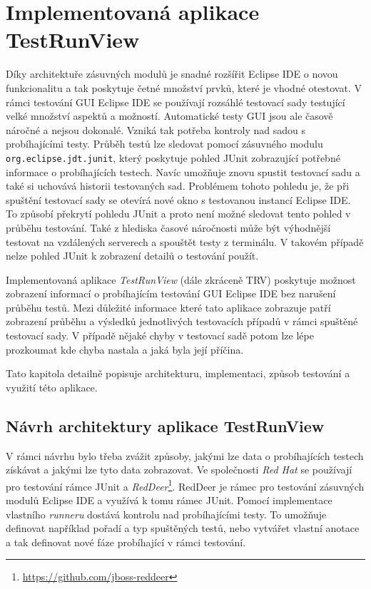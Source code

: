 \chapter{Implementovaná aplikace TestRunView}                             %
Díky architektuře zásuvných modulů je snadné rozšířit Eclipse IDE o novou funkcionalitu a tak poskytuje četné množství prvků, které je vhodné otestovat. V rámci testování GUI Eclipse IDE se používají rozsáhlé testovací sady testující velké množství aspektů a možností. Automatické testy GUI jsou ale časově náročné a nejsou dokonalé. Vzniká tak potřeba kontroly nad sadou s probíhajícími testy. Průběh testů lze sledovat pomocí zásuvného modulu \texttt{org.eclipse.jdt.junit}, který poskytuje pohled JUnit zobrazující potřebné informace o probíhajících testech. Navíc umožňuje znovu spustit testovací sadu a také si uchovává historii testovaných sad. Problémem tohoto pohledu je, že při spuštění testovací sady se otevírá nové okno s testovanou instancí Eclipse IDE. To způsobí překrytí pohledu JUnit a proto není možné sledovat tento pohled v průběhu testování. Také z hlediska časové náročnosti může být výhodnější testovat na vzdálených serverech a spouštět testy z terminálu. V takovém případě nelze pohled JUnit k zobrazení detailů o testování použít.

Implementovaná aplikace \emph{TestRunView} (dále zkráceně TRV) poskytuje možnost zobrazení informací o probíhajícím testování GUI Eclipse IDE bez narušení průběhu testů. Mezi důležité informace které tato aplikace zobrazuje patří zobrazení průběhu a výsledků jednotlivých testovacích případů v rámci spuštěné testovací sady. V případě nějaké chyby v testovací sadě potom lze lépe prozkoumat kde chyba nastala a jaká byla její příčina.

Tato kapitola detailně popisuje architekturu, implementaci, způsob testování a využití této aplikace.

  \section{Návrh architektury aplikace TestRunView}

  V rámci návrhu bylo třeba zvážit způsoby, jakými lze data o probíhajících testech získávat a jakými lze tyto data zobrazovat. Ve společnosti \emph{Red Hat} se používají pro testování rámce JUnit a \emph{RedDeer}\footnote{\url{https://github.com/jboss-reddeer}}. RedDeer je rámec pro testování zásuvných modulů Eclipse IDE a využívá k tomu rámec JUnit. Pomocí implementace vlastního \emph{runneru} dostává kontrolu nad probíhajícími testy. To umožňuje definovat například pořadí a typ spuštěných testů, nebo vytvářet vlastní anotace a tak definovat nové fáze probíhající v rámci testování.

